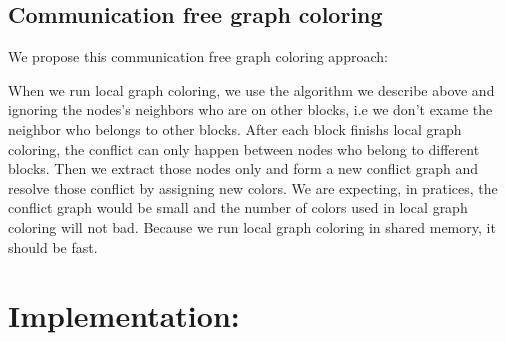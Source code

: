 \documentclass[12pt] {article}
\begin{document}
\subsection{Communication free graph coloring}
We propose this communication free graph coloring approach:
\begin{figure}[!tbh]
\centering        
   \caption{ }
   \label{fig:fig2}
\end{figure} 

When we run local graph coloring, we use the algorithm we describe above and ignoring the nodes's neighbors who are on other blocks, i.e we don't exame the neighbor who belongs to other blocks. After each block finishs local graph coloring, the conflict can only happen between nodes who belong to different blocks. Then we extract those nodes only and form a new conflict graph and resolve those conflict by assigning new colors. We are expecting, in pratices, the conflict graph would be small and the number of colors used in local graph coloring will not bad. Because we run local graph coloring in shared memory, it should be fast. 

\section{Implementation:}
\end{document}
